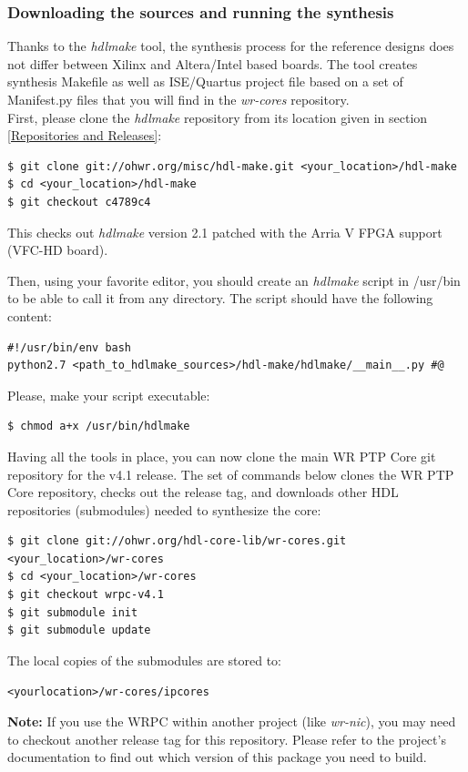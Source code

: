 \documentclass[a4paper, 12pt]{article}
\renewcommand{\_}{\underscore\allowbreak}
\begin{document}
\subsubsection{Downloading the sources and running the synthesis}
Thanks to the \textit{hdlmake} tool, the synthesis process for the reference
designs does not differ between Xilinx and Altera/Intel based boards. The tool creates
synthesis Makefile as well as ISE/Quartus project file based on a set of
Manifest.py files that you will find in the \textit{wr-cores} repository.\\

First, please clone the \textit{hdlmake} repository from its location given in
section \ref{Repositories and Releases}:
\begin{lstlisting}
$ git clone git://ohwr.org/misc/hdl-make.git <your_location>/hdl-make
$ cd <your_location>/hdl-make
$ git checkout c4789c4
\end{lstlisting}
This checks out \textit{hdlmake} version 2.1 patched with the Arria V FPGA
support (VFC-HD board).

Then, using your favorite editor, you should create an \textit{hdlmake} script in
/usr/bin to be able to call it from any directory. The script should have the
following content:
\begin{lstlisting}
#!/usr/bin/env bash
python2.7 <path_to_hdlmake_sources>/hdl-make/hdlmake/__main__.py #@
\end{lstlisting}

Please, make your script executable:
\begin{lstlisting}
$ chmod a+x /usr/bin/hdlmake
\end{lstlisting}

Having all the tools in place, you can now clone the main WR PTP Core git
repository for the v4.1 release. The set of commands below clones the WR PTP Core
repository, checks out the release tag, and downloads other HDL repositories
(submodules) needed to synthesize the core:
\begin{lstlisting}
$ git clone git://ohwr.org/hdl-core-lib/wr-cores.git <your_location>/wr-cores
$ cd <your_location>/wr-cores
$ git checkout wrpc-v4.1
$ git submodule init
$ git submodule update
\end{lstlisting}

The local copies of the submodules are stored to:

\texttt{<your\_location>/wr-cores/ip\_cores}

\vspace{1em}
\textbf{Note:} If you use the WRPC within another project (like
\textit{wr-nic}), you may need to checkout another release tag for this
repository. Please refer to the project's documentation to find out which
version of this package you need to build.
\end{document}
